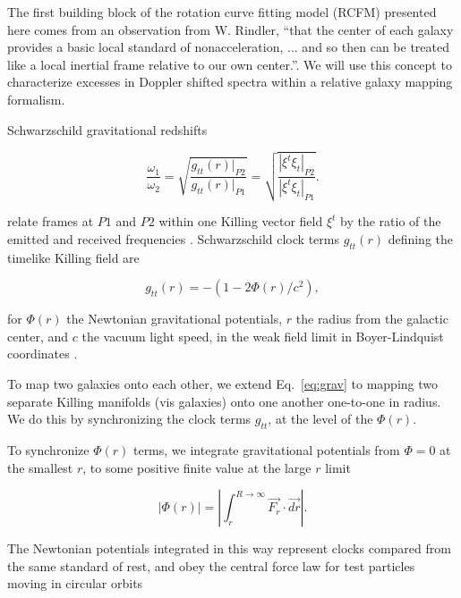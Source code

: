 \documentclass[reprint,%
 amsmath,amssymb,
 aps,
]{revtex4-1}
\begin{document}
The first building block of the rotation curve fitting model (RCFM) presented here comes from an observation from W.    Rindler,    ``that the center of each galaxy provides a basic local standard of nonacceleration, ... and so then can be treated like a local inertial frame relative to our own center.''\cite{rindler2013essential}. 
 We will use this concept  to characterize excesses in Doppler shifted spectra within a relative galaxy mapping formalism.    
 
 Schwarzschild gravitational redshifts  
 
     \begin{equation}
       \frac{\omega_1}{\omega_2}  =\sqrt{\frac{g_{tt}(r)|_{P2}}{g_{tt}(r)|_{P1}}} =\sqrt{\frac{|\xi^t\xi_{t}|_{P2}}{|\xi^t\xi_{t}|_{P1}}}. 
      \label{eq:grav}
    \end{equation}
    
  relate    frames   at   $P1$ and $P2$ within one  Killing vector field $\xi^t$ by the ratio of the emitted and received frequencies \cite{Wald}.  
  Schwarzschild clock  terms $g_{tt}(r)$ defining the timelike Killing field      are 
   
  \begin{equation}
      g_{tt}(r)= -( 1 - 2\Phi(r)/ c^2), 
      \label{clocktime}
  \end{equation} 
  
for $\Phi (r)$ 
the Newtonian  gravitational potentials, $r$  the radius from the galactic center, and $c$   the vacuum light speed, in the weak field limit  in Boyer-Lindquist coordinates \cite{Hartle}. 
  
To map two galaxies onto each other, we extend   Eq.~\ref{eq:grav} to   mapping two separate Killing manifolds (vis galaxies) onto one another  one-to-one in radius. We do this by synchronizing the 
 clock terms  $g_{tt}$,  at the level of  the   $\Phi (r)$. 
 
 To synchronize $\Phi (r)$ terms, we   integrate    gravitational potentials from   $\Phi = 0$ at the  smallest $r$,  to some positive finite value at the large $r$ limit
    
  
 
    \begin{equation}
     | \Phi  (r) |= \left| \int^{R\to \infty}_{r} \vec{F_r}\cdot\vec{dr} \right|.
      \label{eq:Newt2}
      \end{equation}
 
   The Newtonian potentials integrated in this way  represent clocks compared from the same standard of rest, and   obey the central force law for test particles moving in circular orbits
\end{document}
